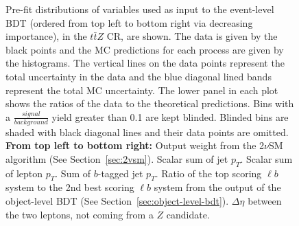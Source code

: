 \begin{figure}[htbp]
\caption{Pre-fit distributions of variables used as input to the event-level BDT (ordered from top left to bottom right via decreasing importance), in the $t\bar{t}Z$ CR, are shown. The data is given by the black points and the MC predictions for each process are given by the histograms. The vertical lines on the data points represent the total uncertainty in the data and the blue diagonal lined bands represent the total MC uncertainty. The lower panel in each plot shows the ratios of the data to the theoretical predictions. Bins with a $\frac{signal}{background}$ yield greater than 0.1 are kept blinded. Blinded bins are shaded with black diagonal lines and their data points are omitted. \textbf{From top left to bottom right:} Output weight from the 2$\nu$SM algorithm (See Section~\ref{sec:2vsm}). Scalar sum of jet $p_{T}$. Scalar sum of lepton $p_{T}$. Sum of $b$-tagged jet $p_{T}$. Ratio of the top scoring $\ell b$ system to the 2nd best scoring $\ell b$ system from the output of the object-level BDT (See Section~\ref{sec:object-level-bdt}). $\Delta \eta$ between the two leptons, not coming from a $Z$ candidate.}
  \label{fig:4lep-ttZCR-eventbdt-vars}
\end{figure}



